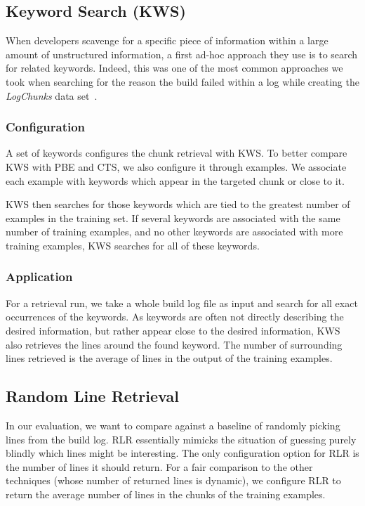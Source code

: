 \subsection{Keyword Search (KWS)}
\label{sec:expl-skws}
When developers scavenge for a specific piece of information within a
large amount of unstructured information, a first ad-hoc approach they
use is to search for related keywords.
Indeed, this was one of the
most common approaches we took when searching for the reason the build
failed within a log while creating the \emph{LogChunks} data
set~\cite{brandt2020logchunks}.

\subsubsection{Configuration}
A set of keywords configures the chunk retrieval with KWS\@.
To better
compare KWS with PBE and CTS, we also configure it through examples.
We associate each example with keywords which appear in the targeted
chunk or close to it.

KWS then searches for those keywords which are tied to the greatest
number of examples in the training set.
If several keywords are associated with the same number of training
examples, and no other keywords are associated with more training
examples, KWS searches for all of these keywords.

\subsubsection{Application}
For a retrieval run, we take a whole build log file as input and
search for all exact occurrences of the keywords.
As keywords are
often not directly describing the desired information, but rather
appear close to the desired information, KWS also retrieves the lines
around the found keyword.
The number of surrounding lines retrieved is
the average of lines in the output of the training examples.


\subsection{Random Line Retrieval}
\label{sec:expl-rlr}
In our evaluation, we want to compare against a baseline of randomly
picking lines from the build log.
RLR essentially mimicks the
situation of guessing purely blindly which lines might be interesting.
The only configuration option for RLR is the number of lines it should
return.
For a fair comparison to the other techniques (whose number of
returned lines is dynamic), we configure RLR to return the average
number of lines in the chunks of the training examples.

